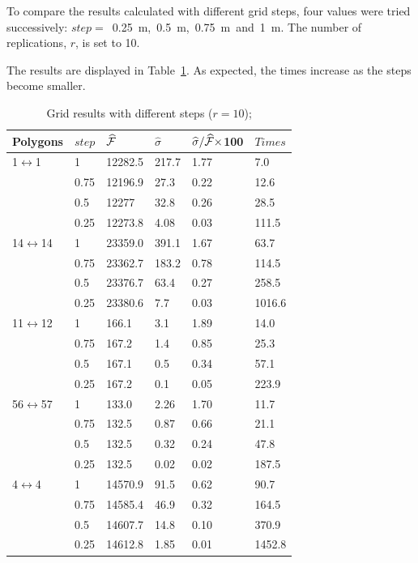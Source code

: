 To compare the results calculated with different grid steps, 
four values were tried successively:
$step=$~0.25~m,~0.5~m,~0.75~m~and~1~m.
The number of replications, $r$, is set to 10.

The results are displayed in Table~\ref{array:step}.
As expected, 
the  times  increase
 as the steps become smaller.

\begin{table}
\footnotesize
\caption{\label{array:step} Grid results  with different steps
($r=10$);}
\begin{center}
\begin{tabular}{|p{1.5cm}|p{1.5cm}|p{1.5cm}|p{1.5cm}|p{1cm}|p{1.5cm}|}
\hline
\textbf{Polygons} & $step$ & $\widehat{{\cal F}}$ &
$\widehat\sigma$ & $\widehat\sigma/\widehat{{\cal F}}\times$100  & $Times$
 \\ \hline
1$\leftrightarrow$1  
 & 1   & 12282.5  & 217.7 & 1.77 &  7.0\\
& 0.75 & 12196.9  & 27.3 & 0.22 & 12.6 \\
& 0.5 & 12277  &  32.8 & 0.26 & 28.5\\
& 0.25 & 12273.8   & 4.08 & 0.03 & 111.5\\
\hline
14$\leftrightarrow$14
 &  1   & 23359.0  & 391.1 & 1.67 & 63.7\\
& 0.75 & 23362.7  &183.2 & 0.78 & 114.5\\
& 0.5 &23376.7  & 63.4 & 0.27 & 258.5\\
 & 0.25 & 23380.6   & 7.7 & 0.03 & 1016.6\\
 \hline
11$\leftrightarrow$12
 &  1   & 166.1  & 3.1 & 1.89 & 14.0\\
& 0.75 & 167.2   & 1.4 & 0.85 & 25.3\\
& 0.5 & 167.1  & 0.5 & 0.34 & 57.1\\
 & 0.25 & 167.2 & 0.1 & 0.05 & 223.9 \\
 \hline
56$\leftrightarrow$57
&  1   & 133.0  & 2.26 & 1.70 & 11.7\\
& 0.75 & 132.5  & 0.87 & 0.66 & 21.1\\
& 0.5 & 132.5  & 0.32 & 0.24 & 47.8\\
 &0.25 &  132.5  & 0.02 & 0.02 & 187.5\\
 \hline
4$\leftrightarrow$4
 & 1   & 14570.9 & 91.5 & 0.62 & 90.7\\
& 0.75 & 14585.4  & 46.9 & 0.32 &  164.5\\
& 0.5 & 14607.7   & 14.8 & 0.10 & 370.9\\
 & 0.25 & 14612.8  & 1.85 & 0.01 & 1452.8 \\
 \hline
\end{tabular}
\end{center}
\normalsize
\end{table}




